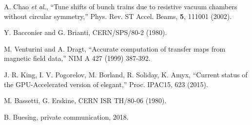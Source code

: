 \documentclass[11pt]{article}
\begin{document}
\begin{thebibliography}{9}
  A. Chao {\em et al.}, ``Tune shifts of bunch trains due to resistive vacuum chambers without circular symmetry,''
  Phys. Rev. ST Accel. Beams, {\bf 5}, 111001 (2002).

Y. Bacconier and G. Brianti, CERN/SPS/80-2 (1980).

M. Venturini and A. Dragt, ``Accurate computation of transfer maps from magnetic field data,'' 
NIM A 427 (1999) 387-392.

J. R. King, I. V. Pogorelov, M. Borland, R. Soliday, K. Amyx,
``Current status of the GPU-Accelerated version of elegant,''
Proc. IPAC15, 623 (2015).

M. Bassetti, G. Erskine, CERN ISR TH/80-06 (1980).

B. Buesing, private communication, 2018.

\end{thebibliography}
\end{document}

